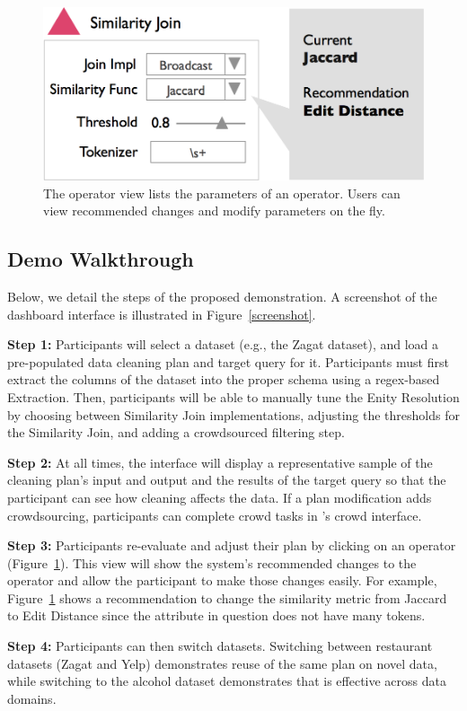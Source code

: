 \begin{figure}[t]
\centering
 \includegraphics[width=0.8\columnwidth]{figs/dashboard_recsys.png}
 \caption{The operator view lists the parameters of an operator. Users can view recommended changes and modify parameters on the fly.}
 \label{screenshot-rec}
 \vspace{-0.4cm}
\end{figure}

\subsection{Demo Walkthrough}
Below, we detail the steps of the proposed demonstration.
A screenshot of the dashboard interface is illustrated in Figure~\ref{screenshot}.

\vspace{0.2em}

\noindent\textbf{Step 1: } Participants will select a dataset (e.g., the Zagat dataset), and load a pre-populated data cleaning plan and target query for it.
Participants must first extract the columns of the dataset into the proper schema using a regex-based Extraction.
Then, participants will be able to manually tune the Enity Resolution by choosing between Similarity Join implementations, adjusting the thresholds for the Similarity Join, and adding a crowdsourced filtering step.

\vspace{0.2em}

\noindent\textbf{Step 2: } At all times, the interface will display a representative sample of the cleaning plan's input and output and the results of the target query so that the participant can see how cleaning affects the data. 
If a plan modification adds crowdsourcing, participants can complete crowd tasks in \sys's crowd interface.

\vspace{0.2em}

\noindent\textbf{Step 3:} Participants re-evaluate and adjust their plan by clicking on an operator (Figure~\ref{screenshot-rec}).
This view will show the system's recommended changes to the operator and allow the participant to make those changes easily.
For example, Figure~\ref{screenshot-rec} shows a recommendation to change the similarity metric from Jaccard to Edit Distance since the attribute in question does not have many tokens.

\vspace{0.2em}

\noindent\textbf{Step 4: } Participants can then switch datasets. Switching between restaurant datasets (Zagat and Yelp) demonstrates reuse of the same plan on novel data, while switching to the alcohol dataset demonstrates that \sys is effective across data domains.
